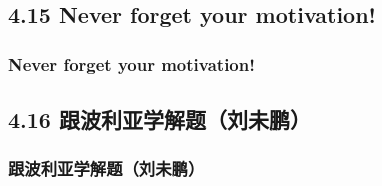 \documentclass[11pt]{article}
\begin{document}
\subsection*{4.15 Never forget your motivation!}
\label{sec:orgheadline199}
\subsubsection*{Never forget your motivation!}
\label{sec:orgheadline198}
\subsection*{4.16 跟波利亚学解题（刘未鹏）}
\label{sec:orgheadline216}
\subsubsection*{跟波利亚学解题（刘未鹏）}
\label{sec:orgheadline208}
\end{document}

